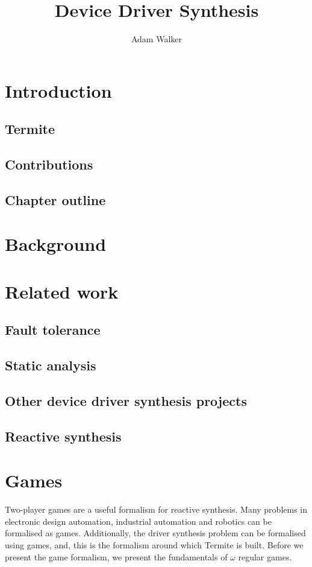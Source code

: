 \documentclass{article}
\title{Device Driver Synthesis}
\author{Adam Walker}
\begin{document}
\maketitle
\tableofcontents

\section{Introduction}

\subsection{Termite}
\subsection{Contributions}
\subsection{Chapter outline}

\section{Background}

\section{Related work}
\subsection{Fault tolerance}
\subsection{Static analysis}
\subsection{Other device driver synthesis projects}
\subsection{Reactive synthesis}

\section{Games}

Two-player games are a useful formalism for reactive synthesis. Many problems in electronic design automation, industrial automation and robotics can be formalised as games. Additionally, the driver synthesis problem can be formalised using games, and, this is the formalism around which Termite is built. Before we present the game formalism, we present the fundamentals of $\omega$ regular games. 
\end{document}
